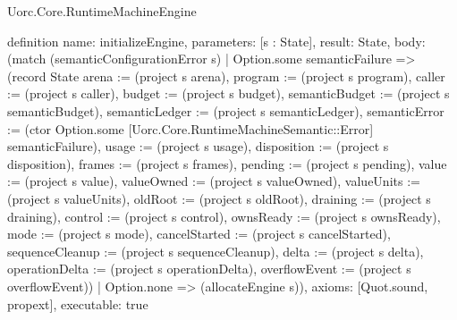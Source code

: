 \begin{lexlean}{Uorc.Core.RuntimeMachineEngine}
\begin{semanticmodule}
definition{
  name: initializeEngine,
  parameters: [s : State],
  result: State,
  body: (match (semanticConfigurationError s)
    | Option.some semanticFailure => (record State {arena := (project s arena), program := (project s program), caller := (project s caller), budget := (project s budget), semanticBudget := (project s semanticBudget), semanticLedger := (project s semanticLedger), semanticError := (ctor Option.some [Uorc.Core.RuntimeMachineSemantic::Error] semanticFailure), usage := (project s usage), disposition := (project s disposition), frames := (project s frames), pending := (project s pending), value := (project s value), valueOwned := (project s valueOwned), valueUnits := (project s valueUnits), oldRoot := (project s oldRoot), draining := (project s draining), control := (project s control), ownsReady := (project s ownsReady), mode := (project s mode), cancelStarted := (project s cancelStarted), sequenceCleanup := (project s sequenceCleanup), delta := (project s delta), operationDelta := (project s operationDelta), overflowEvent := (project s overflowEvent)})
    | Option.none => (allocateEngine s)),
  axioms: [Quot.sound, propext],
  executable: true
}


\end{semanticmodule}
\end{lexlean}
